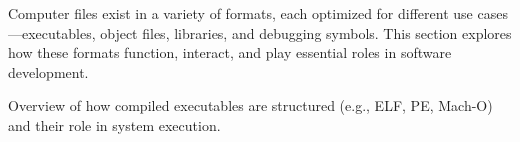 \begin{NxSBox}
	\begin{NxIDBox}
		Computer files exist in a variety of formats, each optimized for different use cases—executables, object files, libraries, and debugging symbols. This section explores how these formats function, interact, and play essential roles in software development.
	\end{NxIDBox}
	\begin{NxIDBoxL}
		 Overview of how compiled executables are structured (e.g., ELF, PE, Mach-O) and their role in system execution.
	\end{NxIDBoxL}
\end{NxSBox}

%

%
%
%


